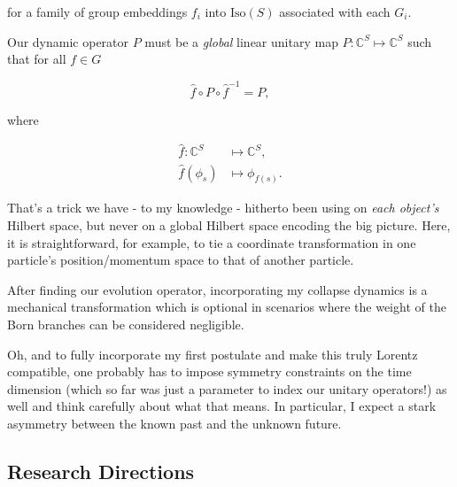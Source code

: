 \documentclass{article}
\begin{document}
for a family of group embeddings $f_i$ into $\mathrm{Iso}(S)$ associated with each $G_i$.

Our dynamic operator $P$ must be a \textit{global} linear unitary map $P:\mathbb{C}^S\longmapsto\mathbb{C}^S$ such that for all $f\in G$

$$\hat{f}\circ P\circ \hat{f}^{-1} = P,$$

where

\begin{align*}
\hat{f}:\mathbb{C}^S &\longmapsto \mathbb{C}^S,\\ \hat{f}(\phi_s) &\mapsto \phi_{f(s)}.
\end{align*}

That's a trick we have - to my knowledge - hitherto been using on \textit{each object's} Hilbert space, but never on a global Hilbert space encoding the big picture. Here, it is straightforward, for example, to tie a coordinate transformation in one particle's position/momentum space to that of another particle.

After finding our evolution operator, incorporating my collapse dynamics is a mechanical transformation which is optional in scenarios where the weight of the Born branches can be considered negligible.

Oh, and to fully incorporate my first postulate and make this truly Lorentz compatible, one probably has to impose symmetry constraints on the time dimension (which so far was just a parameter to index our unitary operators!) as well and think carefully about what that means. In particular, I expect a stark asymmetry between the known past and the unknown future.

\subsection{Research Directions}
\end{document}
